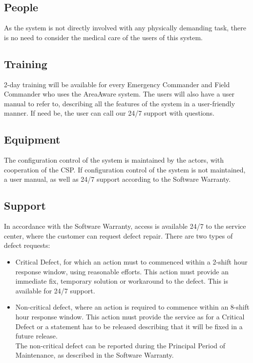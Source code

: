 \subsection{People}
As the system is not directly involved with any physically demanding task, there is no need to consider the medical care of the users of this system.

\subsection{Training}
2-day training will be available for every Emergency Commander and Field Commander who uses the AreaAware system. The users will also have a user manual to refer to, describing all the features of the system in a user-friendly manner. If need be, the user can call our 24/7 support with questions.

\subsection{Equipment}
The configuration control of the system is maintained by the actors, with cooperation of the CSP. If configuration control of the system is not maintained, a user manual, as well as 24/7 support according to the Software Warranty. 

\subsection{Support}
In accordance with the Software Warranty, access is available 24/7 to the service center, where the customer can request defect repair. There are two types of defect requests:
\begin{itemize}
	\itemsep0em
	\item Critical Defect, for which an action must to commenced within a 2-shift hour response window, using reasonable efforts. This action must provide an immediate fix, temporary solution or workaround to the defect. This is available for 24/7 support.
	\item Non-critical defect, where an action is required to commence within an 8-shift hour response window. This action must provide the service as for a Critical Defect or a statement has to be released describing that it will be fixed in a future release. \\
	The non-critical defect can be reported during the Principal Period of Maintenance, as described in the Software Warranty.
\end{itemize}

